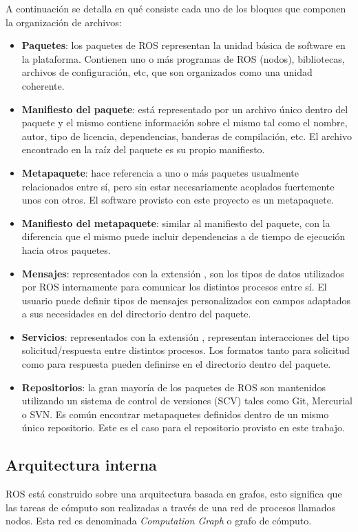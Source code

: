 \newpage
A continuación se detalla en qué consiste cada uno de los bloques que componen la organización de archivos:
\begin{itemize}
    \item \textbf{Paquetes}: los paquetes de ROS representan la unidad básica de software en la plataforma. Contienen uno o más programas de ROS (nodos), bibliotecas, archivos de configuración, etc, que son organizados como una unidad coherente.
    \item \textbf{Manifiesto del paquete}: está representado por un archivo único dentro del paquete y el mismo contiene información sobre el mismo tal como el nombre, autor, tipo de licencia, dependencias, banderas de compilación, etc. El archivo  encontrado en la raíz del paquete es su propio manifiesto.
    \item \textbf{Metapaquete}: hace referencia a uno o más paquetes usualmente relacionados entre sí, pero sin estar necesariamente acoplados fuertemente unos con otros. El software provisto con este proyecto es un metapaquete.
    \item \textbf{Manifiesto del metapaquete}: similar al manifiesto del paquete, con la diferencia que el mismo puede incluir dependencias a de tiempo de ejecución hacia otros paquetes.
    \item \textbf{Mensajes}: representados con la extensión , son los tipos de datos utilizados por ROS internamente para comunicar los distintos procesos entre sí. El usuario puede definir tipos de mensajes personalizados con campos adaptados a sus necesidades en del directorio  dentro del paquete.
    \item  \textbf{Servicios}: representados con la extensión , representan interacciones del tipo solicitud/respuesta entre distintos procesos. Los formatos tanto para solicitud como para respuesta pueden definirse en el directorio  dentro del paquete.
    \item \textbf{Repositorios}: la gran mayoría de los paquetes de ROS son mantenidos utilizando un sistema de control de versiones (SCV) tales como Git, Mercurial o SVN. Es común encontrar metapaquetes definidos dentro de un mismo único repositorio. Este es el caso para el repositorio provisto en este trabajo.
\end{itemize}

\subsection{Arquitectura interna}
ROS está construido sobre una arquitectura basada en grafos, esto significa que las tareas de cómputo son realizadas a través de una red de procesos llamados nodos. Esta red es denominada \textit{Computation Graph} o grafo de cómputo.

